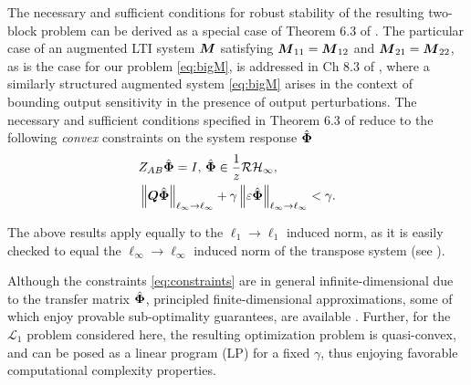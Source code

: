 The necessary and sufficient conditions for robust stability of the resulting two-block problem can be derived as a special case of Theorem 6.3 of \cite{khammash1990stability}.  The particular case of an  augmented LTI system $\boldsymbol{M}$ satisfying $\boldsymbol{M}_{11} = \boldsymbol{M}_{12}$ and $\boldsymbol{M}_{21} = \boldsymbol{M}_{22}$, as is the case for our problem \eqref{eq:bigM}, is addressed in Ch 8.3 of \cite{khammash1990stability}, where a similarly structured augmented system \eqref{eq:bigM} arises in the context of bounding output sensitivity in the presence of output perturbations.  The necessary and sufficient conditions specified in Theorem 6.3 of \cite{khammash1990stability} reduce to the following \emph{convex} constraints on the system response $\hat{\boldsymbol{\Phi}}$
\begin{equation} \label{eq:constraints}
\begin{aligned}
&Z_{AB}\hat{\boldsymbol{\Phi}} = I, \, \hat{\boldsymbol{\Phi}} \in \frac{1}{z}\mathcal{RH}_\infty, \\
& \left\|\boldsymbol{Q}\hat{\boldsymbol{\Phi}}\right\|_{\ell_\infty\to\ell_\infty} + \gamma\left\|\varepsilon\hat{\boldsymbol{\Phi}}\right\|_{\ell_\infty\to\ell_\infty} < \gamma.
\end{aligned}
\end{equation}

\begin{remark}
The above results apply equally to the $\ell_1 \to \ell_1$ induced norm, as it is easily checked to equal the $\ell_\infty \to \ell_\infty$ induced norm of the transpose system (see \cite{matni2017scalable}).
\end{remark}
\begin{remark} Although the constraints \eqref{eq:constraints} are in general infinite-dimensional due to the transfer matrix $\hat{\boldsymbol{\Phi}}$, principled finite-dimensional approximations, some of which enjoy provable sub-optimality guarantees, are available \cite{matni2017scalable,anderson2019system,dean2017sample}.  Further, for the $\mathcal{L}_1$ problem considered here, the resulting optimization problem is quasi-convex, and can be posed as a linear program (LP) for a fixed $\gamma$, thus enjoying favorable computational complexity properties.
\end{remark}

